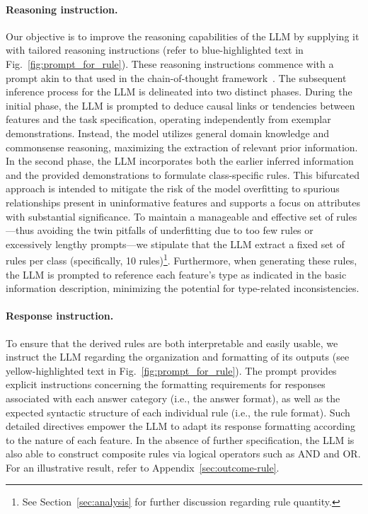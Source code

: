 \paragraph{Reasoning instruction.} Our objective is to improve the reasoning capabilities of the LLM by supplying it with tailored reasoning instructions (refer to blue-highlighted text in Fig.~\ref{fig:prompt_for_rule}). These reasoning instructions commence with a prompt akin to that used in the chain-of-thought framework~\cite{wei2022chain}. The subsequent inference process for the LLM is delineated into two distinct phases. During the initial phase, the LLM is prompted to deduce causal links or tendencies between features and the task specification, operating independently from exemplar demonstrations. Instead, the model utilizes general domain knowledge and commonsense reasoning, maximizing the extraction of relevant prior information. In the second phase, the LLM incorporates both the earlier inferred information and the provided demonstrations to formulate class-specific rules. This bifurcated approach is intended to mitigate the risk of the model overfitting to spurious relationships present in uninformative features and supports a focus on attributes with substantial significance. To maintain a manageable and effective set of rules—thus avoiding the twin pitfalls of underfitting due to too few rules or excessively lengthy prompts—we stipulate that the LLM extract a fixed set of rules per class (specifically, 10 rules)\footnote{See Section~\ref{sec:analysis} for further discussion regarding rule quantity.}. Furthermore, when generating these rules, the LLM is prompted to reference each feature's type as indicated in the basic information description, minimizing the potential for type-related inconsistencies.

\vspace*{-0.12in}
\paragraph{Response instruction.} To ensure that the derived rules are both interpretable and easily usable, we instruct the LLM regarding the organization and formatting of its outputs (see yellow-highlighted text in Fig.~\ref{fig:prompt_for_rule}). The prompt provides explicit instructions concerning the formatting requirements for responses associated with each answer category (i.e., the answer format), as well as the expected syntactic structure of each individual rule (i.e., the rule format). Such detailed directives empower the LLM to adapt its response formatting according to the nature of each feature. In the absence of further specification, the LLM is also able to construct composite rules via logical operators such as AND and OR. For an illustrative result, refer to Appendix~\ref{sec:outcome-rule}.

